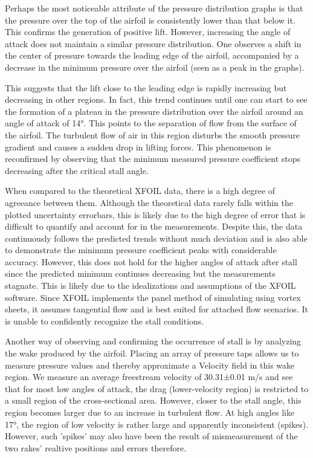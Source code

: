 \documentclass[11pt, letterpaper]{article}
\begin{document}
Perhaps the most noticeable attribute of the pressure distribution graphs is that the pressure over the top of the airfoil is consistently lower than that below it. This confirms the generation of positive lift. However, increasing the angle of attack does not maintain a similar pressure distribution. One observes a shift in the center of pressure towards the leading edge of the airfoil, accompanied by a decrease in the minimum pressure over the airfoil (seen as a peak in the graphs). 

This suggests that the lift close to the leading edge is rapidly increasing but decreasing in other regions. In fact, this trend continues until one can start to see the formation of a plateau in the pressure distribution over the airfoil around an angle of attack of 14°. This points to the separation of flow from the surface of the airfoil. The turbulent flow of air in this region disturbs the smooth pressure gradient and causes a sudden drop in lifting forces. This phenomenon is reconfirmed by observing that the minimum measured pressure coefficient stops decreasing after the critical stall angle. 

When compared to the theoretical XFOIL data, there is a high degree of agreeance between them. Although the theoretical data rarely falls within the plotted uncertainty errorbars, this is likely due to the high degree of error that is difficult to quantify and account for in the measurements. Despite this, the data continuously follows the predicted trends without much deviation and is also able to demonstrate the minimum pressure coefficient peaks with considerable accuracy. However, this does not hold for the higher angles of attack after stall since the predicted minimum continues decreasing but the measurements stagnate. This is likely due to the idealizations and assumptions of the XFOIL software. Since XFOIL implements the panel method of simulating using vortex sheets, it assumes tangential flow and is best suited for attached flow scenarios. It is unable to confidently recognize the stall conditions. 

Another way of observing and confirming the occurrence of stall is by analyzing the wake produced by the airfoil. Placing an array of pressure taps allows us to measure pressure values and thereby approximate a Velocity field in this wake region. We measure an average freestream velocity of 30.31±0.01 m/s and see that for most low angles of attack, the drag (lower-velocity region) is restricted to a small region of the cross-sectional area. However, closer to the stall angle, this region becomes larger due to an increase in turbulent flow. At high angles like 17°, the region of low velocity is rather large and apparently inconsistent (spikes). However, such 'spikes' may also have been the result of mismeasurement of the two rakes' realtive positions and errors therefore. 
\end{document}

